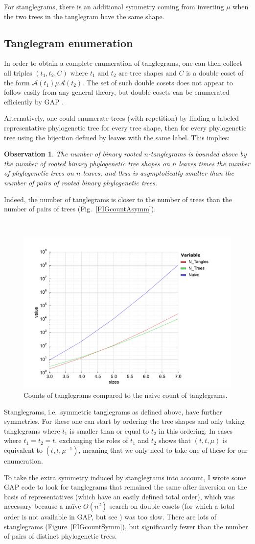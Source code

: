 \documentclass{amsart}
\newtheorem{observation}{Observation}
\newcommand{\aut}{\mathcal A}
\newcommand{\pairing}{\mu}
\newcommand{\arxiv}[1]{#1}
\newcommand{\FIGcountAsymm}{\
\label{FIGcountAsymm}
\begin{figure}
  \arxiv{\includegraphics[width=.8\linewidth]{figures/asymmetric-count}}
  \caption{Counts of tanglegrams compared to the naive count of tanglegrams.}
\end{figure}
}
\begin{document}
For stanglegrams, there is an additional symmetry coming from inverting $\pairing$ when the two trees in the tanglegram have the same shape.


\subsection{Tanglegram enumeration}
In order to obtain a complete enumeration of tanglegrams, one can then collect all triples $(t_1, t_2, C)$ where $t_1$ and $t_2$ are tree shapes and $C$ is a double coset of the form $\aut(t_1) \pairing \aut(t_2)$.
The set of such double cosets does not appear to follow easily from any general theory, but double cosets can be enumerated efficiently by GAP \cite{GAP4}.

Alternatively, one could enumerate trees (with repetition) by finding a labeled representative phylogenetic tree for every tree shape, then for every phylogenetic tree using the bijection defined by leaves with the same label.
This implies:
\begin{observation}
\label{obs:count}
The number of binary rooted $n$-tanglegrams is bounded above by the number of rooted binary phylogenetic tree shapes on $n$ leaves times the number of phylogenetic trees on $n$ leaves, and thus is asymptotically smaller than the number of pairs of rooted binary phylogenetic trees.
\end{observation}
Indeed, the number of tanglegrams is closer to the number of trees than the number of pairs of trees (Fig.~\ref{FIGcountAsymm}).

\FIGcountAsymm

Stanglegrams, i.e.\ symmetric tanglegrams as defined above, have further symmetries.
For these one can start by ordering the tree shapes and only taking tanglegrams where $t_1$ is smaller than or equal to $t_2$ in this ordering.
In cases where $t_1 = t_2 = t$, exchanging the roles of $t_1$ and $t_2$ shows that $(t, t, \mu)$ is equivalent to $(t, t, \mu^{-1})$, meaning that we only need to take one of these for our enumeration.

To take the extra symmetry induced by stanglegrams into account, I wrote some GAP code to look for tanglegrams that remained the same after inversion on the basis of representatives (which have an easily defined total order), which was necessary because a na\"ive $O(n^2)$ search on double cosets (for which a total order is not available in GAP, but see \cite{Hulpke2003-em}) was too slow.
There are lots of stanglegrams (Figure~\ref{FIGcountSymm}), but significantly fewer than the number of pairs of distinct phylogenetic trees.
\end{document}
